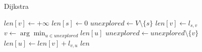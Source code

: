 \documentclass[a4paper,12pt,oneside]{report}
\begin{document}
\begin{framedalgo}{Dijkstra}\label{alg:dijkstra}
\begin{algorithmic}[1]
      \State $\mathit{len}[v]\gets+\infty$
    \EndFor
    \State $\mathit{len}[s]\gets0$
    \State $\mathit{unexplored}\gets V\setminus\{s\}$
      \State $\mathit{len}[v]\gets l_{s,v}$
    \EndFor
      \State $v\gets\arg\min_{u\in\mathit{unexplored}}\mathit{len}[u]$
      \State $\mathit{unexplored}\gets\mathit{unexplored}\setminus\{v\}$
          \State $\mathit{len}[u]\gets\mathit{len}[v]+l_{v,u}$
        \EndIf
      \EndFor
    \EndWhile
    \State \Return $\mathit{len}$
  \EndFunction
\end{algorithmic}
\end{framedalgo}
\end{document}
